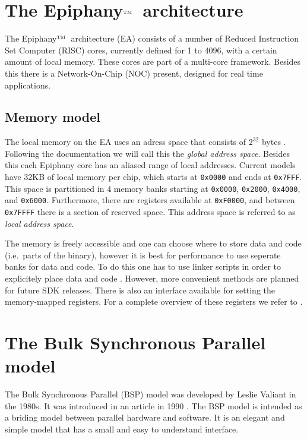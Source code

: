 \documentclass[fleqn]{article}
\renewcommand{\(}{\left(}
\renewcommand{\)}{\right)}
\def\tm{$^{\hbox{\tiny TM}}$~}
\begin{document}
\section{The Epiphany\tm architecture}

The Epiphany\tm architecture (EA) consists of a number of Reduced Instruction Set Computer (RISC) cores, currently defined for 1 to 4096, with a certain amount of local memory. These cores are part of a multi-core framework. Besides this there is a Network-On-Chip (NOC) present, designed for real time applications. 

\subsection{Memory model}

The local memory on the EA uses an adress space that consists of $2^{32}$ bytes \cite{ep:sdkdoc}. Following the documentation we will call this the \emph{global address space}. Besides this each Epiphany core has an aliased range of local addresses. Current models have 32KB of local memory per chip, which starts at \texttt{0x0000} and ends at \texttt{0x7FFF}. This space is partitioned in 4 memory banks starting at \texttt{0x0000}, \texttt{0x2000}, \texttt{0x4000}, and \texttt{0x6000}. Furthermore, there are registers available at \texttt{0xF0000}, and between \texttt{0x7FFFF} there is a section of reserved space. This address space is referred to as \emph{local address space}.



The memory is freely accessible and one can choose where to store data and code (i.e.\ parts of the binary), however it is best for performance to use seperate banks for data and code. To do this one has to use linker scripts in order to explicitely place data and code \cite{ep:sdkdoc}. However, more convenient methods are planned for future SDK releases. There is also an interface available for setting the memory-mapped registers. For a complete overview of these registers we refer to \cite{ep:archdoc}.

\section{The Bulk Synchronous Parallel model}

The Bulk Synchronous Parallel (BSP) model was developed by Leslie Valiant in the 1980s. It was introduced in an article in 1990 \cite{bsp:valiant}. The BSP model is intended as a briding model between parallel hardware and software. It is an elegant and simple model that has a small and easy to understand interface.
\end{document}
